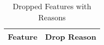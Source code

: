 \begin{table}[htbp]
\centering
\caption{Dropped Features with Reasons}
\label{tab:dropped_features}
\begin{tabular}{lp{8cm}}
\toprule
Feature & Drop Reason \\
\midrule
\bottomrule
\end{tabular}
\end{table}

